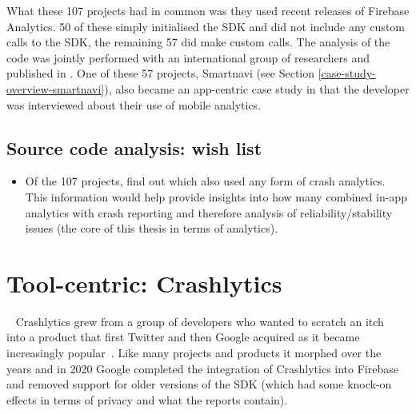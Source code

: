 What these 107 projects had in common was they used recent releases of Firebase Analytics. 50 of these simply initialised the SDK and did not include any custom calls to the SDK, the remaining 57 did make custom calls. The analysis of the code was jointly performed with an international group of researchers and published in \citet{harty2021_logging_practices_with_mobile_analytics}. One of these 57 projects, Smartnavi (see Section \ref{case-study-overview-smartnavi}), also became an app-centric case study in that the developer was interviewed about their use of mobile analytics. 

\subsection{Source code analysis: wish list}
{\small
\begin{itemize}
    \item Of the 107 projects, find out which also used any form of crash analytics. This information would help provide insights into how many combined in-app analytics with crash reporting and therefore analysis of reliability/stability issues (the core of this thesis in terms of analytics).
\end{itemize}
}
\clearpage

\section{Tool-centric: Crashlytics}~\label{case-study-overview-crashlytics}
Crashlytics grew from a group of developers who wanted to scratch an itch~\citep{chang2015_how_six_people_built_crashlytics} into a product that first Twitter and then Google acquired as it became increasingly popular~\citep{___answersblog_2015_june_update}. Like many projects and products it morphed over the years and in 2020 Google completed the integration of Crashlytics into Firebase and removed support for older versions of the SDK (which had some knock-on effects in terms of privacy and what the reports contain).

